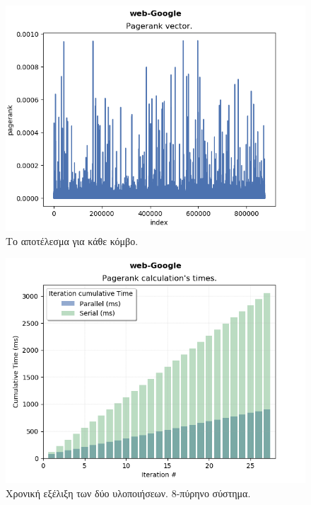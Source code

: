 \begin{center}
\begin{figure}
\includegraphics[width=\linewidth]{plots/pagerank.png}
\caption{Το αποτέλεσμα για κάθε κόμβο.}
\end{figure}

\begin{figure}
\includegraphics[width=\linewidth]{plots/it_times_diades.png}
\caption{Χρονική εξέλιξη των δύο υλοποιήσεων. 8-πύρηνο σύστημα.}
\end{figure}


\end{center}
